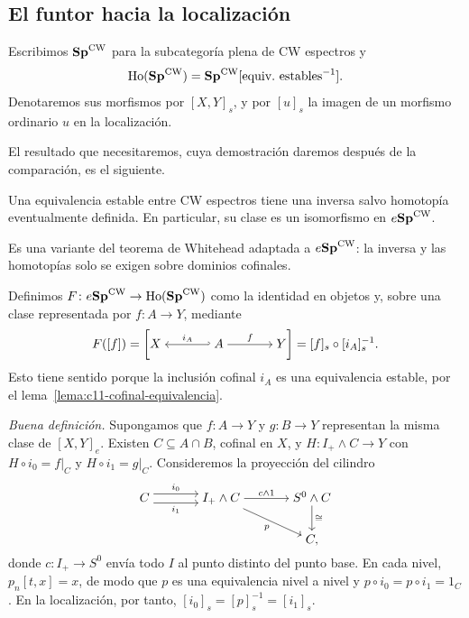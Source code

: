 \subsection{El funtor hacia la localización}

Escribimos $\mathbf{Sp}^{\mathrm{CW}}$ para la subcategoría plena de CW espectros y
\[
\Ho(\Sp^{\mathrm{CW}})=\Sp^{\mathrm{CW}}[\text{equiv.\ estables}^{-1}].
\]
Denotaremos sus morfismos por $[X,Y]_s$, y por $[u]_s$ la imagen de un morfismo ordinario $u$ en la localización.

El resultado que necesitaremos, cuya demostración daremos después de la comparación, es el siguiente.
\begin{lema}\label{lema:c12-inversa-eventual}
Una equivalencia estable entre CW espectros tiene una inversa salvo homotopía eventualmente definida. En particular, su clase es un isomorfismo en $e\mathbf{Sp}^{\mathrm{CW}}$.
\end{lema}
Es una variante del teorema de Whitehead adaptada a $e\mathbf{Sp}^{\mathrm{CW}}$: la inversa y las homotopías solo se exigen sobre dominios cofinales.

Definimos $F\colon e\mathbf{Sp}^{\mathrm{CW}}\to\operatorname{Ho}(\mathbf{Sp}^{\mathrm{CW}})$ como la identidad en objetos y, sobre una clase representada por $f\colon A\to Y$, mediante
\[
F([f])=
\left[\begin{tikzcd}[cramped,column sep=large]
X & A \arrow[l,hook',"i_A"'] \arrow[r,"f"] & Y
\end{tikzcd}\right]
=[f]_s\circ[i_A]_s^{-1}.
\]
Esto tiene sentido porque la inclusión cofinal $i_A$ es una equivalencia estable, por el lema~\ref{lema:c11-cofinal-equivalencia}.

\emph{Buena definición.} Supongamos que $f\colon A\to Y$ y $g\colon B\to Y$ representan la misma clase de $[X,Y]_e$. Existen $C\subseteq A\cap B$, cofinal en $X$, y $H\colon I_+\wedge C\to Y$ con $H\circ i_0=f|_C$ y $H\circ i_1=g|_C$. Consideremos la proyección del cilindro
\[
\begin{tikzcd}[cramped,column sep=large]
C \arrow[r,shift left=1.5,"i_0"] \arrow[r,shift right=1.5,"i_1"']
& I_+\wedge C \arrow[r,"c\wedge1"] \arrow[dr,"p"']
& S^0\wedge C \arrow[d,"\cong"]\\
&& C,
\end{tikzcd}
\]
donde $c\colon I_+\to S^0$ envía todo $I$ al punto distinto del punto base. En cada nivel, $p_n[t,x]=x$, de modo que $p$ es una equivalencia nivel a nivel y $p\circ i_0=p\circ i_1=1_C$. En la localización, por tanto, $[i_0]_s=[p]_s^{-1}=[i_1]_s$.

